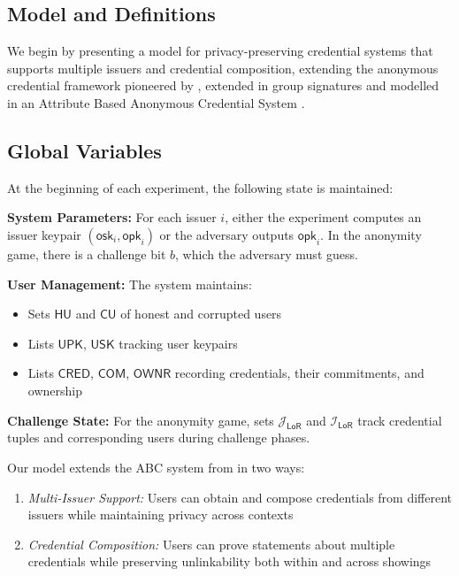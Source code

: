 \subsection{Model and Definitions}
We begin by presenting a model for privacy-preserving credential systems that supports multiple issuers and credential composition, extending the anonymous credential framework pioneered by \cite{hutchison_signature_2004}, extended in group signatures \cite{hutchison_foundations_2005} and modelled in an Attribute Based Anonymous Credential System \cite{fuchsbauer_structure-preserving_2019}.

\subsection{Global Variables}
At the beginning of each experiment, the following state is maintained:

\noindent \textbf{System Parameters:} For each issuer $i$, either the experiment computes an issuer keypair $(\mathsf{osk}_i, \mathsf{opk}_i)$ or the adversary outputs $\mathsf{opk}_i$. In the anonymity game, there is a challenge bit $b$, which the adversary must guess.

\noindent \textbf{User Management:} The system maintains:
\begin{itemize}
\item Sets $\mathsf{HU}$ and $\mathsf{CU}$ of honest and corrupted users
\item Lists $\mathsf{UPK}$, $\mathsf{USK}$ tracking user keypairs
\item Lists $\mathsf{CRED}$, $\mathsf{COM}$, $\mathsf{OWNR}$ recording credentials, their commitments, and ownership
\end{itemize}

\noindent \textbf{Challenge State:} For the anonymity game, sets $\mathcal{J}_{\mathsf{LoR}}$ and $\mathcal{I}_{\mathsf{LoR}}$ track credential tuples and corresponding users during challenge phases.

\noindent  Our model extends the ABC system from \cite{fuchsbauer_structure-preserving_2019} in two ways:
\begin{enumerate}
    \item \textit{Multi-Issuer Support:} Users can obtain and compose credentials from different issuers while maintaining privacy across contexts
    \item \textit{Credential Composition:} Users can prove statements about multiple credentials while preserving unlinkability both within and across showings
\end{enumerate}


